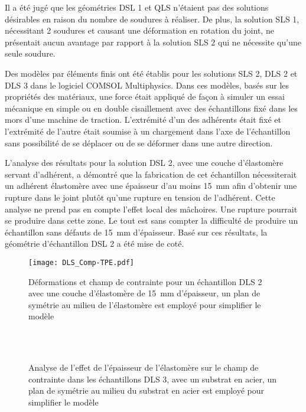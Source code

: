 Il a été jugé que les géométries DSL 1 et QLS n'étaient pas des solutions désirables en raison du nombre de soudures à réaliser. 
De plus, la solution SLS 1, nécessitant 2 soudures et causant une déformation en rotation du joint, ne présentait aucun avantage par rapport à la solution SLS 2 qui ne nécessite qu'une seule soudure. 

Des modèles par éléments finis ont été établis pour les solutions SLS 2, DLS 2 et DLS 3 dans le logiciel COMSOL Mul\-ti\-phy\-sics\-\textregistered . 
Dans ces modèles, basés sur les propriétés des matériaux, une force était appliqué de façon à simuler un essai mécanique en simple ou en double cisaillement avec des échantillons fixé dans les mors d'une machine de traction. 
L'extrémité d'un des adhérents était fixé et l'extrémité de l'autre était soumise à un chargement dans l'axe de l'échantillon sans possibilité de se déplacer ou de se déformer dans une autre direction. 

L'analyse des résultats pour la solution DSL 2, avec une couche d'élastomère servant d'adhérent, a démontré que la fabrication de cet échantillon nécessiterait un adhérent élastomère avec une épaisseur d'au moins \SI{15}{\milli\metre} afin d'obtenir une rupture dans le joint plutôt qu'une rupture en tension de l'adhérent. 
Cette analyse ne prend pas en compte l'effet local des mâchoires. 
Une rupture pourrait se produire dans cette zone. 
Le tout est sans compter la difficulté de produire un échantillon sans défauts de \SI{15}{\milli\metre} d'épaisseur. 
Basé sur ces résultats, la géométrie d'échantillon DSL 2 a été mise de coté.

\begin{figure}[h]
	\centering
	\texttt{[image: DLS\_Comp-TPE.pdf]}
	\caption{Déformations et champ de contrainte pour un échantillon DLS 2 avec une couche d'élastomère de \SI{15}{\milli\metre} d'épaisseur, un plan de symétrie au milieu de l'élastomère est employé pour simplifier le modèle}
	\label{fig:DLS_comp_TPE}
\end{figure}

\begin{figure}[h!]
	\centering
	 \\
	 \\
	\caption{Analyse de l'effet de l'épaisseur de l'élastomère sur le champ de contrainte dans les échantillons DLS 3, avec un substrat en acier, un plan de symétrie au milieu du substrat en acier est employé pour simplifier le modèle}
	\label{fig:DLS_metal}
\end{figure}
\FloatBarrier


